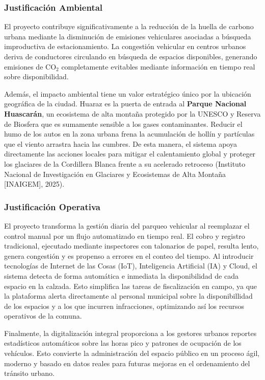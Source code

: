 \documentclass[12pt,a4paper]{article}
\begin{document}
\subsubsection{Justificación Ambiental}

El proyecto contribuye significativamente a la reducción de la huella de carbono urbana mediante la disminución de emisiones vehiculares asociadas a búsqueda improductiva de estacionamiento. La congestión vehicular en centros urbanos deriva de conductores circulando en búsqueda de espacios disponibles, generando emisiones de CO$_2$ completamente evitables mediante información en tiempo real sobre disponibilidad.

Además, el impacto ambiental tiene un valor estratégico único por la ubicación geográfica de la ciudad. Huaraz es la puerta de entrada al \textbf{Parque Nacional Huascarán}, un ecosistema de alta montaña protegido por la UNESCO y Reserva de Biosfera que es sumamente sensible a los gases contaminantes. Reducir el humo de los autos en la zona urbana frena la acumulación de hollín y partículas que el viento arrastra hacia las cumbres. De esta manera, el sistema apoya directamente las acciones locales para mitigar el calentamiento global y proteger los glaciares de la Cordillera Blanca frente a su acelerado retroceso (Instituto Nacional de Investigación en Glaciares y Ecosistemas de Alta Montaña [INAIGEM], 2025).

\subsubsection{Justificación Operativa}

El proyecto transforma la gestión diaria del parqueo vehicular al reemplazar el control manual por un flujo automatizado en tiempo real. El cobro y registro tradicional, ejecutado mediante inspectores con talonarios de papel, resulta lento, genera congestión y es propenso a errores en el conteo del tiempo. Al introducir tecnologías de Internet de las Cosas (IoT), Inteligencia Artificial (IA) y Cloud, el sistema detecta de forma automática e inmediata la disponibilidad de cada espacio en la calzada. Esto simplifica las tareas de fiscalización en campo, ya que la plataforma alerta directamente al personal municipal sobre la disponibillidad de los espacios y a los que incurren infracciones, optimizando así los recursos operativos de la comuna.

Finalmente, la digitalización integral proporciona a los gestores urbanos reportes estadísticos automáticos sobre las horas pico y patrones de ocupación de los vehículos. Esto convierte la administración del espacio público en un proceso ágil, moderno y basado en datos reales para futuras mejoras en el ordenamiento del tránsito urbano.
\end{document}
